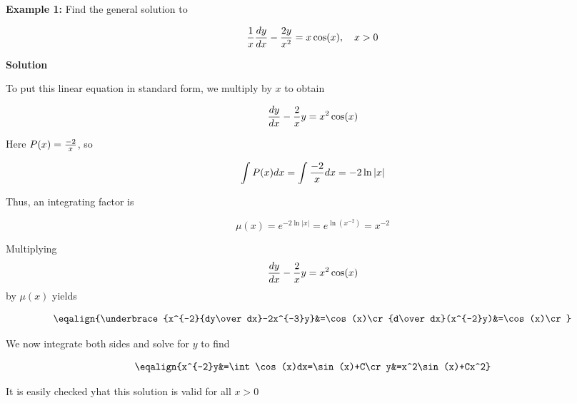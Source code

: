 \nopagenumbers
{\bf Example 1:} Find the general solution to

$${1\over x}{dy\over dx}-{2y\over x^2}=x\cos(x),\quad x>0$$

\vskip 10pt
{\bf Solution}

\vskip 6pt
To put this linear equation in standard form, we multiply by $x$ to obtain

$${dy\over dx}-{2\over x}y=x^2\cos(x)$$

Here $P(x)={-2\over x}$, so

$$\int P(x)dx=\int{-2\over x}dx=-2\ln|x|$$

Thus, an integrating factor is

$$\mu(x)=e^{-2\ln|x|}=e^{\ln(x^{-2})}=x^{-2}$$

Multiplying $${dy\over dx}-{2\over x}y=x^2\cos(x)$$ by $\mu(x)$ yields

$$\eqalign{\underbrace{x^{-2}{dy\over dx}-2x^{-3}y}&=\cos(x)\cr
		{d\over dx}(x^{-2}y)&=\cos(x)\cr}$$

We now integrate both sides and solve for $y$ to find

$$\eqalign{x^{-2}y&=\int\cos(x)dx=\sin(x)+C\cr
	y&=x^2\sin(x)+Cx^2}$$

It is easily checked yhat this solution is valid for all $x>0$

\vfill\eject
\bye
